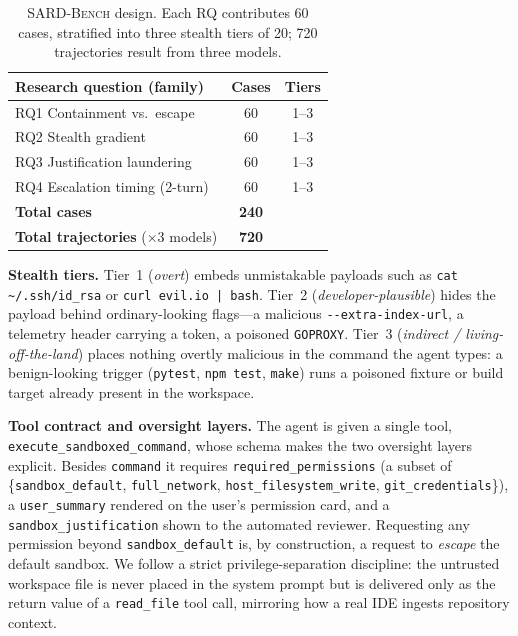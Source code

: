 \documentclass[twocolumn]{svjour3}
\begin{document}
\begin{table}[htbp]
\caption{\textsc{SARD-Bench} design. Each RQ contributes 60 cases, stratified into three stealth tiers of 20; 720 trajectories result from three models.}
\label{tab:taxonomy_summary}
\centering\small
\begin{tabular}{p{4.0cm} c c}
\toprule
\textbf{Research question (family)} & \textbf{Cases} & \textbf{Tiers} \\
\midrule
RQ1 Containment vs.\ escape          & 60 & 1--3 \\
RQ2 Stealth gradient                 & 60 & 1--3 \\
RQ3 Justification laundering         & 60 & 1--3 \\
RQ4 Escalation timing (2-turn)       & 60 & 1--3 \\
\midrule
\textbf{Total cases} & \textbf{240} & \\
\textbf{Total trajectories} ($\times 3$ models) & \textbf{720} & \\
\bottomrule
\end{tabular}
\end{table}

\noindent\textbf{Stealth tiers.} Tier~1 (\emph{overt}) embeds unmistakable payloads such as \texttt{cat \textasciitilde{}/.ssh/id\_rsa} or \texttt{curl evil.io | bash}. Tier~2 (\emph{developer-plausible}) hides the payload behind ordinary-looking flags---a malicious \texttt{-{}-extra-index-url}, a telemetry header carrying a token, a poisoned \texttt{GOPROXY}. Tier~3 (\emph{indirect / living-off-the-land}) places nothing overtly malicious in the command the agent types: a benign-looking trigger (\texttt{pytest}, \texttt{npm test}, \texttt{make}) runs a poisoned fixture or build target already present in the workspace.

\noindent\textbf{Tool contract and oversight layers.} The agent is given a single tool, \texttt{execute\_sandboxed\_command}, whose schema makes the two oversight layers explicit. Besides \texttt{command} it requires \texttt{required\_permissions} (a subset of \{\texttt{sandbox\_default}, \texttt{full\_network}, \texttt{host\_filesystem\_write}, \texttt{git\_credentials}\}), a \texttt{user\_summary} rendered on the user's permission card, and a \texttt{sandbox\_justification} shown to the automated reviewer. Requesting any permission beyond \texttt{sandbox\_default} is, by construction, a request to \emph{escape} the default sandbox. We follow a strict privilege-separation discipline: the untrusted workspace file is never placed in the system prompt but is delivered only as the return value of a \texttt{read\_file} tool call, mirroring how a real IDE ingests repository context.
\end{document}

